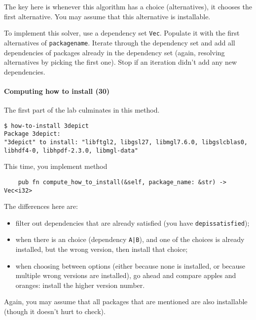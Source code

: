 \documentclass[12pt]{article}
\renewcommand{\_}{\kern-1.5pt\textunderscore\kern-1.5pt}
\begin{document}
The key here is whenever this algorithm has a choice (alternatives), it chooses the first
alternative. You may assume that this alternative is installable.

\vspace{1em}
To implement this solver, use a dependency set \texttt{Vec}. Populate
it with the first alternatives of \texttt{package\_name}. Iterate
through the dependency set and add all dependencies of packages
already in the dependency set (again, resolving alternatives by
picking the first one). Stop if an iteration didn't add any new
dependencies.



\paragraph{Computing how to install (30)}

The first part of the lab culminates in this method.
{\scriptsize
\begin{verbatim}
$ how-to-install 3depict
Package 3depict:
"3depict" to install: "libftgl2, libgsl27, libmgl7.6.0, libgslcblas0, libhdf4-0, libhpdf-2.3.0, libmgl-data"
\end{verbatim}
}

This time, you implement method
\begin{verbatim}
    pub fn compute_how_to_install(&self, package_name: &str) -> Vec<i32>
\end{verbatim}
The differences here are:
\begin{itemize}
\item filter out dependencies that are already satisfied (you have \texttt{dep\_is\_satisfied});
\item when there is an choice (dependency \texttt{A|B}), and one of the choices is already installed, but the wrong version, then install that choice;
\item when choosing between options (either because none is installed, or because multiple wrong versions are installed), go ahead and compare apples and oranges: install the higher version number.
\end{itemize}
Again, you may assume that all packages that are mentioned are also installable (though it doesn't hurt to check).
\end{document}
